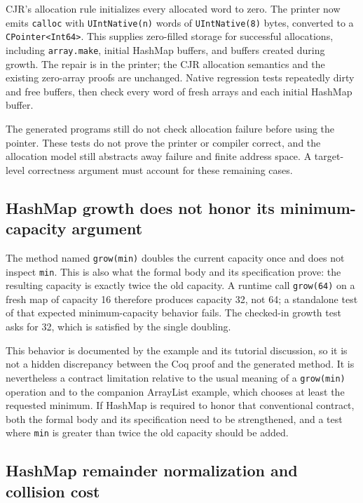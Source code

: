 \documentclass[11pt]{article}
\begin{document}
CJR's allocation rule initializes every allocated word to zero. The printer
now emits \texttt{calloc} with \texttt{UIntNative(n)} words of
\texttt{UIntNative(8)} bytes, converted to a
\texttt{CPointer<Int64>}. This supplies zero-filled storage for successful
allocations, including \texttt{array.make}, initial HashMap buffers, and
buffers created during growth. The repair is in the printer; the CJR
allocation semantics and the existing zero-array proofs are unchanged.
Native regression tests repeatedly dirty and free buffers, then check every
word of fresh arrays and each initial HashMap buffer.

The generated programs still do not check allocation failure before using
the pointer. These tests do not prove the printer or compiler correct, and
the allocation model still abstracts away failure and finite address space.
A target-level correctness argument must account for these remaining cases.

\subsection{HashMap growth does not honor its minimum-capacity argument}
\label{sec:hashmap-grow-min}

The method named \texttt{grow(min)} doubles the current capacity once and
does not inspect \texttt{min}.  This is also what the formal body and its
specification prove: the resulting capacity is exactly twice the old
capacity.  A runtime call \texttt{grow(64)} on a fresh map of capacity 16
therefore produces capacity 32, not 64; a standalone test of that expected
minimum-capacity behavior fails.  The checked-in growth test asks for 32,
which is satisfied by the single doubling.

This behavior is documented by the example and its tutorial discussion, so
it is not a hidden discrepancy between the Coq proof and the generated
method.  It is nevertheless a contract limitation relative to the usual
meaning of a \texttt{grow(min)} operation and to the companion ArrayList
example, which chooses at least the requested minimum.  If HashMap is
required to honor that conventional contract, both the formal body and its
specification need to be strengthened, and a test where \texttt{min} is
greater than twice the old capacity should be added.

\subsection{HashMap remainder normalization and collision cost}
\label{sec:hashmap-residue-cost}
\end{document}
